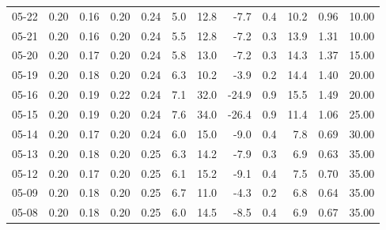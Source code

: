 \begin{threeparttable}
{\begin{tabular}{lrrrrrrrrrrr}
  05-22 &          0.20 &          0.16 &          0.20 &        0.24 &                 5.0 &                12.8 &       -7.7 &                 0.4 &             10.2 &            0.96 &                  10.00 \\
  05-21 &          0.20 &          0.16 &          0.20 &        0.24 &                 5.5 &                12.8 &       -7.2 &                 0.3 &             13.9 &            1.31 &                  10.00 \\
  05-20 &          0.20 &          0.17 &          0.20 &        0.24 &                 5.8 &                13.0 &       -7.2 &                 0.3 &             14.3 &            1.37 &                  15.00 \\
  05-19 &          0.20 &          0.18 &          0.20 &        0.24 &                 6.3 &                10.2 &       -3.9 &                 0.2 &             14.4 &            1.40 &                  20.00 \\
  05-16 &          0.20 &          0.19 &          0.22 &        0.24 &                 7.1 &                32.0 &      -24.9 &                 0.9 &             15.5 &            1.49 &                  20.00 \\
  05-15 &          0.20 &          0.19 &          0.20 &        0.24 &                 7.6 &                34.0 &      -26.4 &                 0.9 &             11.4 &            1.06 &                  25.00 \\
  05-14 &          0.20 &          0.17 &          0.20 &        0.24 &                 6.0 &                15.0 &       -9.0 &                 0.4 &              7.8 &            0.69 &                  30.00 \\
  05-13 &          0.20 &          0.18 &          0.20 &        0.25 &                 6.3 &                14.2 &       -7.9 &                 0.3 &              6.9 &            0.63 &                  35.00 \\
  05-12 &          0.20 &          0.17 &          0.20 &        0.25 &                 6.1 &                15.2 &       -9.1 &                 0.4 &              7.5 &            0.70 &                  35.00 \\
  05-09 &          0.20 &          0.18 &          0.20 &        0.25 &                 6.7 &                11.0 &       -4.3 &                 0.2 &              6.8 &            0.64 &                  35.00 \\
  05-08 &          0.20 &          0.18 &          0.20 &        0.25 &                 6.0 &                14.5 &       -8.5 &                 0.4 &              6.9 &            0.67 &                  35.00 \\

\end{tabular}}
\end{threeparttable}
